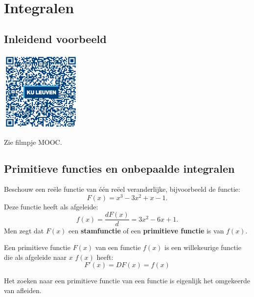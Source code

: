 \section{Integralen}

\subsection{Inleidend voorbeeld}
\begin{minipage}{.25\linewidth}
	\raggedright
	\includegraphics[width=4cm]{6_afgeleiden_integralen/inputs/QR_Code_INLEIDENDVB_module6_2new}
\end{minipage}
\begin{minipage}{.7\linewidth}
	Zie filmpje MOOC.
\end{minipage}

\subsection{Primitieve functies en onbepaalde integralen}

Beschouw een re\"ele functie van \'e\'en re\"eel veranderlijke, bijvoorbeeld de functie:
\begin{equation*}
F(x) = x^3-3x^2+x-1.
\end{equation*}
Deze functie heeft als afgeleide:
\begin{equation*}
f(x) = \frac{dF(x)}{d} = 3x^2-6x+1.
\end{equation*}
Men zegt dat $F(x)$ een \textbf{stamfunctie} of een \textbf{primitieve functie} is van $f(x)$.

\begin{definitie}
Een primitieve functie $F(x)$ van een functie $f(x)$ is een willekeurige functie die als afgeleide naar $x$ $f(x)$  heeft:	
\begin{equation*}
F'(x)=DF(x)=f(x)
\end{equation*}
\end{definitie}

Het zoeken naar een primitieve functie van een functie is eigenlijk het omgekeerde van afleiden.

